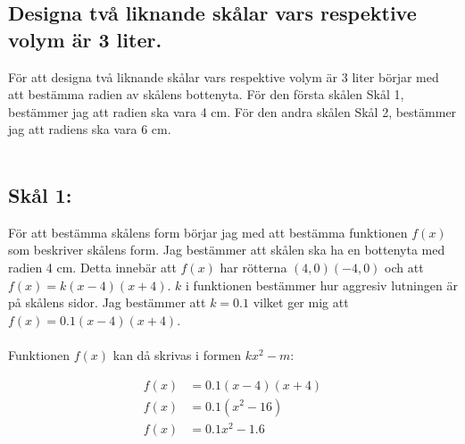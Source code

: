 \documentclass[12pt]{article}
\begin{document}
\subsection*{Designa två liknande skålar vars respektive volym är 3 liter.}

För att designa två liknande skålar vars respektive volym är 3 liter börjar med att bestämma radien av skålens bottenyta. För den första skålen Skål 1, bestämmer jag att radien ska vara 4 cm. För den andra skålen Skål 2, bestämmer jag att radiens ska vara 6 cm.
\\\\
\subsection*{Skål 1:}
För att bestämma skålens form börjar jag med att bestämma funktionen $f(x)$ som beskriver skålens form. Jag bestämmer att skålen ska ha en bottenyta med radien 4 cm. Detta innebär att $f(x)$ har rötterna $(4,0) (-4,0)$ och att $f(x)=k(x-4)(x+4)$. $k$ i funktionen bestämmer hur aggresiv lutningen är på skålens sidor. Jag bestämmer att $k=0.1$ vilket ger mig att \\ $f(x)=0.1(x-4)(x+4)$.
\\\\
Funktionen $f(x)$ kan då skrivas i formen $kx^2-m$:

\begin{align*}
    f(x)&=0.1(x-4)(x+4)\\
    f(x)&=0.1(x^2-16)\\
    f(x)&=0.1x^2-1.6\\
\end{align*}
\end{document}
